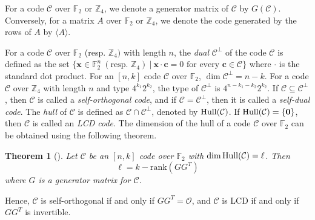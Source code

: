 \documentclass{article}
\newtheorem{theorem}{Theorem}[section]
\theoremstyle{definition}
\theoremstyle{remark}
\begin{document}
For a code $\mathcal{C}$ over $\mathbb{F}_2$ or $\mathbb{Z}_4$, we denote a generator matrix of $\mathcal{C}$ by $G(\mathcal{C})$. Conversely, for a matrix $A$ over $\mathbb{F}_2$ or $\mathbb{Z}_4$, we denote the code generated by the rows of $A$ by $\langle A\rangle$.

For a code $\mathcal{C}$ over $\mathbb{F}_2$ (resp. $\mathbb{Z}_4)$ with length $n$, the \textit{dual} $\mathcal{C}^\perp$ of the code $\mathcal{C}$ is defined as the set $\{\mathbf{x}\in\mathbb{F}_2^n~ (\text{resp. }\mathbb{Z}_4)~|~\mathbf{x}\cdot \mathbf{c}=0\text{ for every }\mathbf{c}\in\mathcal{C}\}$ where $\cdot$ is the standard dot product. For an $[n, k]$ code $\mathcal{C}$ over $\mathbb{F}_2$, $\dim\mathcal{C}^\perp=n-k$. For a code $\mathcal{C}$ over $\mathbb{Z}_4$ with length $n$ and type $4^{k_1}2^{k_2}$, the type of $\mathcal{C}^\perp$ is $4^{n-k_1-k_2}2^{k_2}$. If $\mathcal{C}\subseteq\mathcal{C}^\perp$, then $\mathcal{C}$ is called a \textit{self-orthogonal code}, and if $\mathcal{C}=\mathcal{C}^\perp$, then it is called a \textit{self-dual code}. The \textit{hull} of $\mathcal{C}$ is defined as $\mathcal{C}\cap\mathcal{C}^\perp$, denoted by ${\rm Hull}(\mathcal{C})$. If ${\rm Hull}(\mathcal{C})=\{\mathbf{0}\}$, then $\mathcal{C}$ is called an \textit{LCD code}. The dimension of the hull of a code $\mathcal{C}$ over $\mathbb{F}_2$ can be obtained using the following theorem.
\begin{theorem}[\cite{LZ-2019}]
    Let $\mathcal{C}$ be an $[n, k]$ code over $\mathbb{F}_2$ with $\dim {\rm Hull}(\mathcal{C})=\ell$. Then
    \[
    \ell=k-\text{rank}(GG^T)
    \]
    where $G$ is a generator matrix for $\mathcal{C}$.
\end{theorem}
Hence, $\mathcal{C}$ is self-orthogonal if and only if $GG^T=\mathcal{O}$, and $\mathcal{C}$ is LCD if and only if $GG^T$ is invertible.
\end{document}
